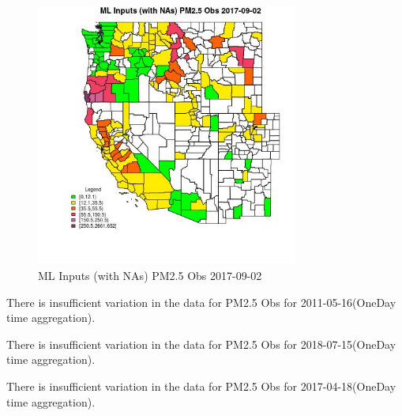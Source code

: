 \begin{figure} 
\centering  
\includegraphics[width=0.77\textwidth]{Code_Outputs/Report_ML_input_PM25_Step4_part_e_de_duplicated_aves_compiled_2019-05-21wNAs_CountyPM25_ObsMean2017-09-02.jpg} 
\caption{\label{fig:Report_ML_input_PM25_Step4_part_e_de_duplicated_aves_compiled_2019-05-21wNAsCountyPM25_ObsMean2017-09-02}ML Inputs (with NAs) PM2.5 Obs 2017-09-02} 
\end{figure} 
 

There is insufficient variation in the data for PM2.5 Obs for 2011-05-16(OneDay time aggregation). 
 

There is insufficient variation in the data for PM2.5 Obs for 2018-07-15(OneDay time aggregation). 
 

There is insufficient variation in the data for PM2.5 Obs for 2017-04-18(OneDay time aggregation). 
 

\clearpage 

